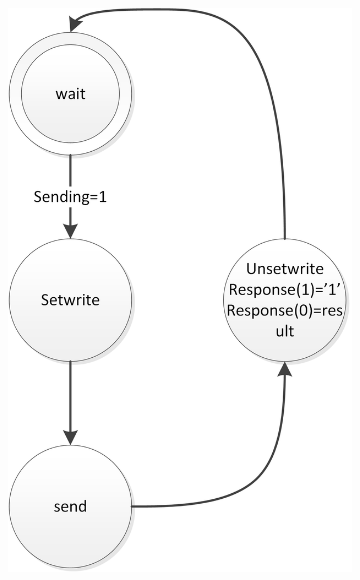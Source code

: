 \documentclass{report}
\begin{document}
\begin{figure}[H]
\begin{subfigure}{0.20\linewidth}
\includegraphics[width=\linewidth]{FSMSender}
\end{subfigure}
\end{figure}
\end{document}
